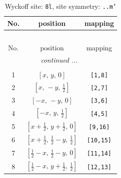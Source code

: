 \documentclass[fleqn,8pt]{jsarticle}
\begin{document}
\begin{longtable}{ccc}
\caption{Wyckoff site: {\tt 8l}, site symmetry: {\tt ..m'}}
 \\
 \hline \hline
No. & position & mapping \\ \hline \endfirsthead

\multicolumn{2}{l}{\tablename\ \thetable{}} \\
 \hline \hline
No. & position & mapping \\ \hline \endhead

 \hline \hline
\multicolumn{2}{r}{\footnotesize\it continued ...} \\ \endfoot

 \hline \hline
\multicolumn{2}{r}{} \\ \endlastfoot

1 & $\left[ x,\, y,\, 0 \right]$ & {\tt [1,8]} \\ \hline
2 & $\left[ x,\, - y,\, \frac{1}{2} \right]$ & {\tt [2,7]} \\ \hline
3 & $\left[ - x,\, - y,\, 0 \right]$ & {\tt [3,6]} \\ \hline
4 & $\left[ - x,\, y,\, \frac{1}{2} \right]$ & {\tt [4,5]} \\ \hline
5 & $\left[ x + \frac{1}{2},\, y + \frac{1}{2},\, 0 \right]$ & {\tt [9,16]} \\ \hline
6 & $\left[ x + \frac{1}{2},\, \frac{1}{2} - y,\, \frac{1}{2} \right]$ & {\tt [10,15]} \\ \hline
7 & $\left[ \frac{1}{2} - x,\, \frac{1}{2} - y,\, 0 \right]$ & {\tt [11,14]} \\ \hline
8 & $\left[ \frac{1}{2} - x,\, y + \frac{1}{2},\, \frac{1}{2} \right]$ & {\tt [12,13]} \\
\end{longtable}
\renewcommand{\arraystretch}{1.2}
\end{document}
